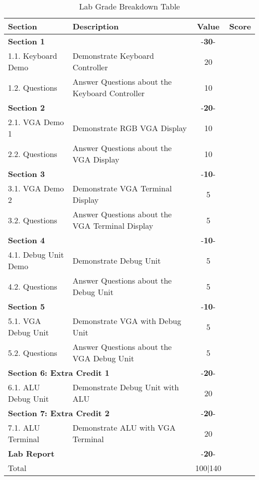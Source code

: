 \documentclass{article}
\begin{document}
\begin{table}[!htb]
  \begin{center}
    \begin{tabular}[width=0.8\textwidth]{|l|l|c|l|}
       \hline
       Section & Description & Value & Score\\
       \hline 
       \multicolumn{2}{|l}{\textbf{Section 1}}  & -\textbf{30}- &\\
       \hline
       1.1. Keyboard Demo & Demonstrate Keyboard Controller & 20 &\\
       1.2. Questions & Answer Questions about the Keyboard Controller & 10 &\\
       \hline
       \multicolumn{2}{|l}{\textbf{Section 2}}  & -\textbf{20}- &\\
       \hline
       2.1. VGA Demo 1 & Demonstrate RGB VGA Display & 10 &\\
       2.2. Questions & Answer Questions about the VGA Display & 10 &\\
       \hline
       \multicolumn{2}{|l}{\textbf{Section 3}}  & -\textbf{10}- &\\
       \hline
       3.1. VGA Demo 2 & Demonstrate VGA Terminal Display & 5 &\\
       3.2. Questions & Answer Questions about the VGA Terminal Display & 5 &\\
       \hline
       \multicolumn{2}{|l}{\textbf{Section 4}}  & -\textbf{10}- &\\
       \hline
       4.1. Debug Unit Demo &  Demonstrate Debug Unit & 5 &\\
       4.2. Questions & Answer Questions about the Debug Unit & 5 &\\
       \hline
       \multicolumn{2}{|l}{\textbf{Section 5}}  & -\textbf{10}- &\\
       \hline
       5.1. VGA Debug Unit & Demonstrate VGA with Debug Unit & 5 &\\
       5.2. Questions & Answer Questions about the VGA Debug Unit & 5 &\\
       \hline
       \multicolumn{2}{|l}{\textbf{Section 6: Extra Credit 1}}  & -\textbf{20}- &\\
       \hline
       6.1. ALU Debug Unit & Demonstrate Debug Unit with ALU & 20 &\\
       \hline
       \multicolumn{2}{|l}{\textbf{Section 7: Extra Credit 2}}  & -\textbf{20}- &\\
       \hline
       7.1. ALU Terminal & Demonstrate ALU with VGA Terminal & 20 &\\
       \hline
       \multicolumn{2}{|l}{\textbf{Lab Report}}  & -\textbf{20}- &\\
       \hline
       \hline
       \multicolumn{2}{|l}{Total} & \multicolumn{1}{c|}{100|140} &\\
       \hline
    \end{tabular}
  \end{center}
  \caption{Lab Grade Breakdown Table}
\end{table}
\end{document}
